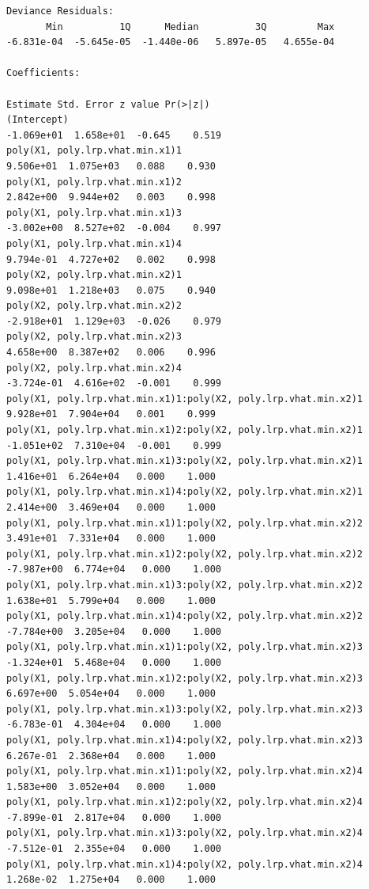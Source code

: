 \documentclass[twoside,12pt]{article}
\begin{document}
\begin{itemize}
\begin{verbatim}
Deviance Residuals: 
       Min          1Q      Median          3Q         Max  
-6.831e-04  -5.645e-05  -1.440e-06   5.897e-05   4.655e-04  

Coefficients:
                                                                  Estimate Std. Error z value Pr(>|z|)
(Intercept)                                                     -1.069e+01  1.658e+01  -0.645    0.519
poly(X1, poly.lrp.vhat.min.x1)1                                  9.506e+01  1.075e+03   0.088    0.930
poly(X1, poly.lrp.vhat.min.x1)2                                  2.842e+00  9.944e+02   0.003    0.998
poly(X1, poly.lrp.vhat.min.x1)3                                 -3.002e+00  8.527e+02  -0.004    0.997
poly(X1, poly.lrp.vhat.min.x1)4                                  9.794e-01  4.727e+02   0.002    0.998
poly(X2, poly.lrp.vhat.min.x2)1                                  9.098e+01  1.218e+03   0.075    0.940
poly(X2, poly.lrp.vhat.min.x2)2                                 -2.918e+01  1.129e+03  -0.026    0.979
poly(X2, poly.lrp.vhat.min.x2)3                                  4.658e+00  8.387e+02   0.006    0.996
poly(X2, poly.lrp.vhat.min.x2)4                                 -3.724e-01  4.616e+02  -0.001    0.999
poly(X1, poly.lrp.vhat.min.x1)1:poly(X2, poly.lrp.vhat.min.x2)1  9.928e+01  7.904e+04   0.001    0.999
poly(X1, poly.lrp.vhat.min.x1)2:poly(X2, poly.lrp.vhat.min.x2)1 -1.051e+02  7.310e+04  -0.001    0.999
poly(X1, poly.lrp.vhat.min.x1)3:poly(X2, poly.lrp.vhat.min.x2)1  1.416e+01  6.264e+04   0.000    1.000
poly(X1, poly.lrp.vhat.min.x1)4:poly(X2, poly.lrp.vhat.min.x2)1  2.414e+00  3.469e+04   0.000    1.000
poly(X1, poly.lrp.vhat.min.x1)1:poly(X2, poly.lrp.vhat.min.x2)2  3.491e+01  7.331e+04   0.000    1.000
poly(X1, poly.lrp.vhat.min.x1)2:poly(X2, poly.lrp.vhat.min.x2)2 -7.987e+00  6.774e+04   0.000    1.000
poly(X1, poly.lrp.vhat.min.x1)3:poly(X2, poly.lrp.vhat.min.x2)2  1.638e+01  5.799e+04   0.000    1.000
poly(X1, poly.lrp.vhat.min.x1)4:poly(X2, poly.lrp.vhat.min.x2)2 -7.784e+00  3.205e+04   0.000    1.000
poly(X1, poly.lrp.vhat.min.x1)1:poly(X2, poly.lrp.vhat.min.x2)3 -1.324e+01  5.468e+04   0.000    1.000
poly(X1, poly.lrp.vhat.min.x1)2:poly(X2, poly.lrp.vhat.min.x2)3  6.697e+00  5.054e+04   0.000    1.000
poly(X1, poly.lrp.vhat.min.x1)3:poly(X2, poly.lrp.vhat.min.x2)3 -6.783e-01  4.304e+04   0.000    1.000
poly(X1, poly.lrp.vhat.min.x1)4:poly(X2, poly.lrp.vhat.min.x2)3  6.267e-01  2.368e+04   0.000    1.000
poly(X1, poly.lrp.vhat.min.x1)1:poly(X2, poly.lrp.vhat.min.x2)4  1.583e+00  3.052e+04   0.000    1.000
poly(X1, poly.lrp.vhat.min.x1)2:poly(X2, poly.lrp.vhat.min.x2)4 -7.899e-01  2.817e+04   0.000    1.000
poly(X1, poly.lrp.vhat.min.x1)3:poly(X2, poly.lrp.vhat.min.x2)4 -7.512e-01  2.355e+04   0.000    1.000
poly(X1, poly.lrp.vhat.min.x1)4:poly(X2, poly.lrp.vhat.min.x2)4  1.268e-02  1.275e+04   0.000    1.000


\end{verbatim}
\end{itemize}
\end{document}
